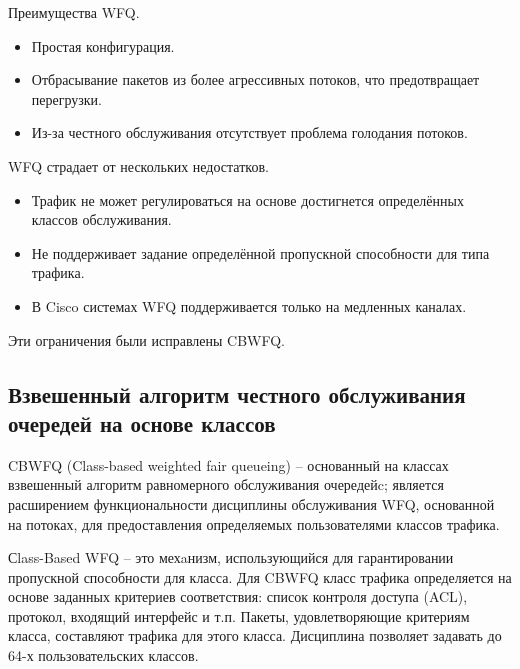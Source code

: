     Преимущества WFQ.
    \begin{itemize}
        \item Простая конфигурация.
        \item Отбрасывание пакетов из более агрессивных потоков, что предотвращает перегрузки.
		\item Из-за честного обслуживания отсутствует проблема голодания потоков.
    \end{itemize}

    WFQ страдает от нескольких недостатков.
    \begin{itemize}
        \item Трафик не может регулироваться на основе достигнется  определённых классов обслуживания.
        \item Не поддерживает задание определённой пропускной способности для типа трафика.
		\item В Cisco системах WFQ поддерживается только на медленных каналах.\cite{wfqdis}
    \end{itemize}

    Эти ограничения были исправлены CBWFQ.

    \subsection{Взвешенный алгоритм честного обслуживания очередей на основе классов}


    CBWFQ (Class-based weighted fair queueing) -- основанный на классах взвешенный алгоритм равномерного обслуживания 
    очередейc\cite{Vagesna}; является расширением функциональности дисциплины обслуживания WFQ,
    основанной на потоках, для предоставления определяемых пользователями классов трафика. 

    Сlass-Based WFQ -- это мехaнизм, использующийся для гарантировании пропускной способности
    для класса. Для CBWFQ класс трафика определяется на основе заданных критериев
    соответствия: список контроля доступа (ACL), протокол, входящий интерфейс и т.п. Пакеты,
    удовлетворяющие критериям класса, составляют трафика для этого класса. Дисциплина
    позволяет задавать до 64-х пользовательских классов.
		
